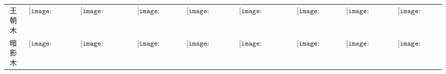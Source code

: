 \begin{longtable}{|c|cccccccc|}
王朝木&$\begin{array}{c}\texttt{[image: figures/Dynasty\_Candle.png]}\end{array}$&$\begin{array}{c}\texttt{[image: figures/Large\_Dynasty\_Candle.png]}\end{array}$&$\begin{array}{c}\texttt{[image: figures/Dynasty\_Lamp.png]}\end{array}$&$\begin{array}{c}\texttt{[image: figures/Dynasty\_Lantern.png]}\end{array}$&$\begin{array}{c}\texttt{[image: figures/Large\_Dynasty\_Lantern.png]}\end{array}$&$\begin{array}{c}\texttt{[image: figures/Dynasty\_Door.png]}\end{array}$&$\begin{array}{c}\texttt{[image: figures/Dynasty\_Toilet.png]}\end{array}$&$\begin{array}{c}\texttt{[image: figures/Dynasty\_Chest.png]}\end{array}$\\
暗影木&$\begin{array}{c}\texttt{[image: figures/Ebonwood\_Candle.png]}\end{array}$&$\begin{array}{c}\texttt{[image: figures/Ebonwood\_Candelabra.png]}\end{array}$&$\begin{array}{c}\texttt{[image: figures/Ebonwood\_Lamp.png]}\end{array}$&$\begin{array}{c}\texttt{[image: figures/Ebonwood\_Lantern.png]}\end{array}$&$\begin{array}{c}\texttt{[image: figures/Ebonwood\_Chandelier.png]}\end{array}$&$\begin{array}{c}\texttt{[image: figures/Ebonwood\_Door.png]}\end{array}$&$\begin{array}{c}\texttt{[image: figures/Ebonwood\_Toilet.png]}\end{array}$&$\begin{array}{c}\texttt{[image: figures/Ebonwood\_Chest.png]}\end{array}$\\

\end{longtable}
